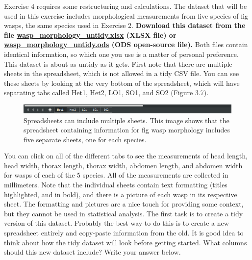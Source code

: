 \documentclass[
]{scrbook}
\begin{document}
Exercise 4 requires some restructuring and calculations.
The dataset that will be used in this exercise includes morphological measurements from five species of fig wasps, the same species used in Exercise 2.
\textbf{Download this dataset from the file \href{https://github.com/bradduthie/SCIU4T4/blob/main/data/wasp_morphology_untidy.xlsx?raw=true}{wasp\_morphology\_untidy.xlsx} (XLSX file) or \href{https://github.com/bradduthie/SCIU4T4/blob/main/data/wasp_morphology_untidy.ods?raw=true}{wasp\_morphology\_untidy.ods} (ODS open-source file).}
Both files contain identical information, so which one you use is a matter of personal preference.
This dataset is about as untidy as it gets.
First note that there are multiple sheets in the spreadsheet, which is not allowed in a tidy CSV file.
You can see these sheets by looking at the very bottom of the spreadsheet, which will have separating tabs called Het1, Het2, LO1, SO1, and SO2 (Figure 3.7).

\begin{figure}
\includegraphics[width=1\linewidth]{img/spreadsheet_tabs} \caption{Spreadsheets can include multiple sheets. This image shows that the spreadsheet containing information for fig wasp morphology includes five separate sheets, one for each species.}\label{fig:unnamed-chunk-18}
\end{figure}

You can click on all of the different tabs to see the measurements of head length, head width, thorax length, thorax width, abdomen length, and abdomen width for wasps of each of the 5 species.
All of the measurements are collected in millimeters.
Note that the individual sheets contain text formatting (titles highlighted, and in bold), and there is a picture of each wasp in its respective sheet.
The formatting and pictures are a nice touch for providing some context, but they cannot be used in statistical analysis.
The first task is to create a tidy version of this dataset.
Probably the best way to do this is to create a new spreadsheet entirely and copy-paste information from the old.
It is good idea to think about how the tidy dataset will look before getting started.
What columns should this new dataset include? Write your answer below.

\begin{verbatim}




\end{verbatim}
\end{document}
